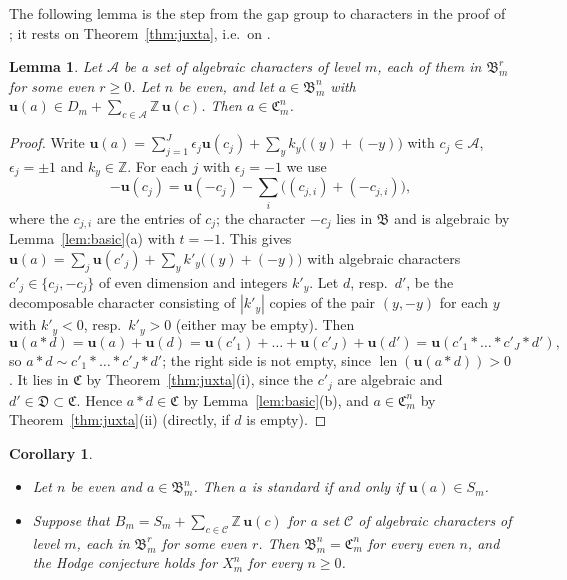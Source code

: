 \documentclass[11pt]{amsart}
\newtheorem{lemma}[theorem]{Lemma}
\newtheorem{corollary}[theorem]{Corollary}
\theoremstyle{definition}
\theoremstyle{remark}
\numberwithin{equation}{section}
\newcommand{\Z}{\mathbb{Z}}
\newcommand{\fB}{\mathfrak{B}}
\newcommand{\fC}{\mathfrak{C}}
\newcommand{\fD}{\mathfrak{D}}
\newcommand{\uu}{\mathbf{u}}
\newcommand{\len}{\operatorname{len}}
\begin{document}
The following lemma is the step from the gap group to characters in the proof of \cite[Thm.~0.1]{Ao00}; it rests on Theorem~\ref{thm:juxta}, i.e.\ on \cite[Lemma~4.1(i),(ii)]{Ao00}.

\begin{lemma}\label{lem:transfer}
Let $\mathcal A$ be a set of algebraic characters of level $m$, each of them in $\fB^r_m$ for some even $r\ge0$. Let $n$ be even, and let $a\in\fB^n_m$ with $\uu(a)\in D_m+\sum_{c\in\mathcal A}\Z\,\uu(c)$. Then $a\in\fC^n_m$.
\end{lemma}

\begin{proof}
Write $\uu(a)=\sum_{j=1}^J\epsilon_j\uu(c_j)+\sum_yk_y\bigl((y)+(-y)\bigr)$ with $c_j\in\mathcal A$, $\epsilon_j=\pm1$ and $k_y\in\Z$. For each $j$ with $\epsilon_j=-1$ we use
\[
-\uu(c_j)=\uu(-c_j)-\textstyle\sum_i\bigl((c_{j,i})+(-c_{j,i})\bigr),
\]
where the $c_{j,i}$ are the entries of $c_j$; the character $-c_j$ lies in $\fB$ and is algebraic by Lemma~\ref{lem:basic}(a) with $t=-1$. This gives $\uu(a)=\sum_j\uu(c'_j)+\sum_yk'_y\bigl((y)+(-y)\bigr)$ with algebraic characters $c'_j\in\{c_j,-c_j\}$ of even dimension and integers $k'_y$. Let $d$, resp.\ $d'$, be the decomposable character consisting of $|k'_y|$ copies of the pair $(y,-y)$ for each $y$ with $k'_y<0$, resp.\ $k'_y>0$ (either may be empty). Then
\[
\uu(a*d)=\uu(a)+\uu(d)=\uu(c'_1)+\dots+\uu(c'_J)+\uu(d')=\uu(c'_1*\dots*c'_J*d'),
\]
so $a*d\sim c'_1*\dots*c'_J*d'$; the right side is not empty, since $\len(\uu(a*d))>0$. It lies in $\fC$ by Theorem~\ref{thm:juxta}(i), since the $c'_j$ are algebraic and $d'\in\fD\subset\fC$. Hence $a*d\in\fC$ by Lemma~\ref{lem:basic}(b), and $a\in\fC^n_m$ by Theorem~\ref{thm:juxta}(ii) (directly, if $d$ is empty).
\end{proof}

\begin{corollary}\label{cor:transfer}
\begin{itemize}
\item[(i)] Let $n$ be even and $a\in\fB^n_m$. Then $a$ is standard if and only if $\uu(a)\in S_m$.
\item[(ii)] Suppose that $B_m=S_m+\sum_{c\in\mathcal C}\Z\,\uu(c)$ for a set $\mathcal C$ of algebraic characters of level $m$, each in $\fB^r_m$ for some even $r$. Then $\fB^n_m=\fC^n_m$ for every even $n$, and the Hodge conjecture holds for $X^n_m$ for every $n\ge0$.
\end{itemize}
\end{corollary}
\end{document}
